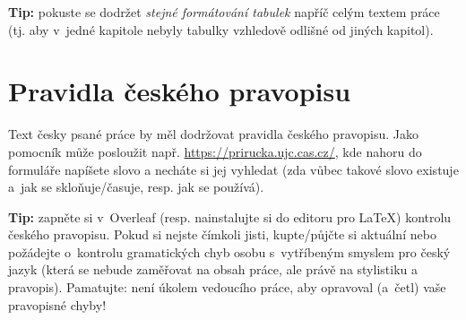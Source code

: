\textbf{Tip:} pokuste se dodržet \textit{stejné formátování tabulek} napříč celým textem práce (tj. aby v~jedné kapitole nebyly tabulky vzhledově odlišné od jiných kapitol).


\section{Pravidla českého pravopisu}\label{sekcePravidla}
Text česky psané práce by měl dodržovat pravidla českého pravopisu. Jako pomocník může posloužit např. \url{https://prirucka.ujc.cas.cz/}, kde nahoru do formuláře napíšete slovo a necháte si jej vyhledat (zda vůbec takové slovo existuje a~jak se skloňuje/časuje, resp. jak se používá).
\par 
{\bf Tip:} zapněte si v~Overleaf (resp. nainstalujte si do editoru pro \LaTeX) kontrolu českého pravopisu. Pokud si nejste čímkoli jisti, kupte/půjčte si aktuální  nebo požádejte o~kontrolu gramatických chyb osobu s~vytříbeným smyslem pro český jazyk (která se nebude zaměřovat na obsah práce, ale právě na stylistiku a pravopis). Pamatujte: není úkolem vedoucího práce, aby opravoval (a~četl) vaše pravopisné chyby!




